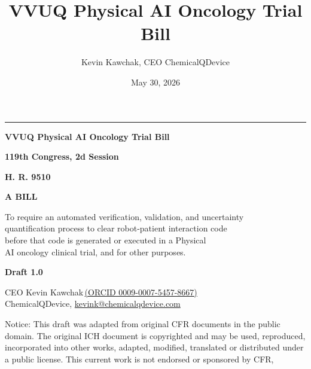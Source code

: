 \documentclass[11pt]{article}
\title{VVUQ Physical AI Oncology Trial Bill}
\author{Kevin Kawchak, CEO ChemicalQDevice}
\date{May 30, 2026}
\begin{document}
\begin{titlepage}
\centering
\vspace*{1.1cm}
{\color{billnavy}\rule{\textwidth}{3pt}}\par
\vspace{0.3cm}
{\LARGE\bfseries\sffamily\color{billnavy} VVUQ Physical AI Oncology Trial Bill\par}
\vspace{0.5cm}
{\large\bfseries\sffamily\color{billnavy} 119th Congress, 2d Session\par}
\vspace{0.18cm}
{\Large\bfseries H. R. 9510\par}
\vspace{0.35cm}
{\large\bfseries A BILL\par}
\vspace{0.25cm}
\begin{minipage}{0.86\textwidth}
\centering\small
To require an automated verification, validation, and uncertainty\\
quantification process to clear robot-patient interaction code\\before that code
is generated or executed in a Physical\\AI oncology clinical trial, and for other
purposes.
\end{minipage}\par
\vspace{0.6cm}
{\large\bfseries Draft 1.0\par}
\vspace{0.6cm}
{\normalsize CEO Kevin Kawchak\,\href{https://orcid.org/0009-0007-5457-8667}{(ORCID 0009-0007-5457-8667)}\\
ChemicalQDevice, \href{mailto:kevink@chemicalqdevice.com}{kevink@chemicalqdevice.com}\par}
\vspace{0.9cm}
\begin{minipage}{0.86\textwidth}
\small\raggedright
Notice: This draft was adapted from original CFR documents in the public domain.
The original ICH document is copyrighted and may be used, reproduced,
incorporated into other works, adapted, modified, translated or distributed
under a public license. This current work is not endorsed or sponsored by CFR,

\end{minipage}
\end{titlepage}
\end{document}
